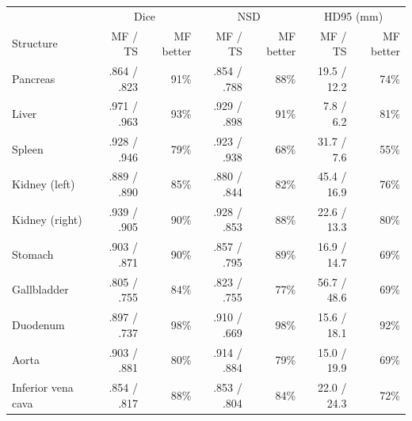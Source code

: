 \begin{tabular}{lrrrrrr}
\toprule
 & \multicolumn{2}{c}{Dice} & \multicolumn{2}{c}{NSD} & \multicolumn{2}{c}{HD95 (mm)} \\
Structure & MF / TS & MF better & MF / TS & MF better & MF / TS & MF better \\
\midrule
Pancreas & .864 / .823 & 91\% & .854 / .788 & 88\% & 19.5 / 12.2 & 74\% \\
Liver & .971 / .963 & 93\% & .929 / .898 & 91\% & 7.8 / 6.2 & 81\% \\
Spleen & .928 / .946 & 79\% & .923 / .938 & 68\% & 31.7 / 7.6 & 55\% \\
Kidney (left) & .889 / .890 & 85\% & .880 / .844 & 82\% & 45.4 / 16.9 & 76\% \\
Kidney (right) & .939 / .905 & 90\% & .928 / .853 & 88\% & 22.6 / 13.3 & 80\% \\
Stomach & .903 / .871 & 90\% & .857 / .795 & 89\% & 16.9 / 14.7 & 69\% \\
Gallbladder & .805 / .755 & 84\% & .823 / .755 & 77\% & 56.7 / 48.6 & 69\% \\
Duodenum & .897 / .737 & 98\% & .910 / .669 & 98\% & 15.6 / 18.1 & 92\% \\
Aorta & .903 / .881 & 80\% & .914 / .884 & 79\% & 15.0 / 19.9 & 69\% \\
Inferior vena cava & .854 / .817 & 88\% & .853 / .804 & 84\% & 22.0 / 24.3 & 72\% \\
\bottomrule
\end{tabular}
